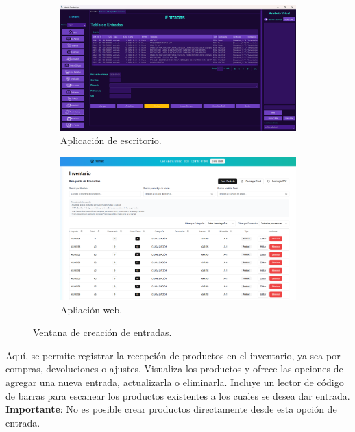 \begin{figure}[ht!]
\centering
\begin{subfigure}{0.45\textwidth}
    \includegraphics[width=\textwidth]{imgs/InsApp.png}
    \caption{Aplicación de escritorio.}
    \label{fig:ins1}
\end{subfigure}
\hfill
\begin{subfigure}{0.45\textwidth}
    \includegraphics[width=\textwidth]{imgs/Almacen General/inventario/inventario_1_general.png}
    \caption{Apliación web.}
    \label{fig:ins2}
\end{subfigure}        
\caption{Ventana de creación de entradas.}
\label{fig:ins}
\end{figure}



Aquí, se permite registrar la recepción de productos en el inventario, ya sea por compras, devoluciones o ajustes. Visualiza los productos y ofrece las opciones de agregar una nueva entrada, actualizarla o eliminarla. Incluye un lector de código de barras para escanear los productos existentes a los cuales se desea dar entrada. 
\textbf{Importante}: No es posible crear productos directamente desde esta opción de entrada. 

